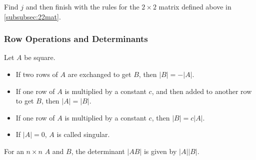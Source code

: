         Find $j$ and then finish with the rules for the $2 \times 2$ matrix defined above in \eqref{subsubsec:22mat}.

        \subsubsection{Row Operations and Determinants}
        Let $A$ be square.

        \begin{itemize}
        \item If two rows of $A$ are exchanged to get $B$, then $|B| = -|A|$.
        \item If one row of $A$ is multiplied by a constant $c$, and then added to another row to get $B$, then $|A| = |B|$.
        \item If one row of $A$ is multiplied by a constant $c$, then $|B| = c|A|$.
        \item If $|A| = 0$, $A$ is called singular.
        \end{itemize}

        For an $n \times n$ $A$ and $B$, the determinant $|AB|$ is given by $|A||B|$.

